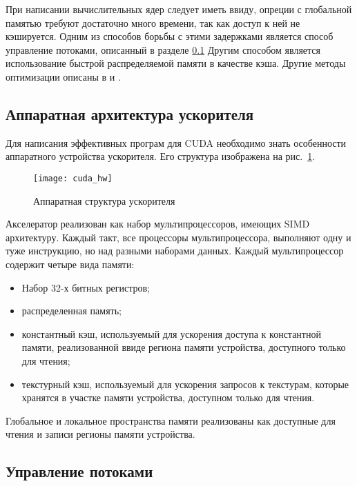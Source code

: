 При написании вычислительных ядер следует иметь ввиду, опреции с глобальной памятью требуют достаточно много времени, так как доступ к ней не кэшируется. Одним из способов борьбы с этими задержками является способ управление потоками, описанный в разделе \ref{c:cuda_hw} Другим способом является использование быстрой распределяемой памяти в качестве кэша. Другие методы оптимизации описаны в \cite{cuda_struct_alg} и \cite{cuda_optim}.

\subsection{Аппаратная архитектура ускорителя}
\label{c:cuda_hw}

Для написания эффективных програм для CUDA необходимо знать особенности аппаратного устройства ускорителя. Его структура изображена на рис.~\ref{fig:cuda_hw}.

\begin{figure}[ht]
\center
\texttt{[image: cuda\_hw]}
\caption{Аппаратная структура ускорителя}
\label{fig:cuda_hw}
\end{figure}

Акселератор реализован как набор мультипроцессоров, имеющих SIMD архитектуру. Каждый такт, все процессоры мультипроцессора, выполняют одну и туже инструкцию, но над разными наборами данных. Каждый мультипроцессор содержит четыре вида памяти:

\begin{itemize}
\item Набор 32-х битных регистров;

\item распределенная память;

\item константный кэш, используемый для ускорения доступа к константной памяти, реализованной ввиде региона памяти устройства, доступного только для чтения;

\item текстурный кэш, используемый для ускорения запросов к текстурам, которые хранятся в участке памяти устройства, доступном только для чтения.
\end{itemize}

Глобальное и локальное пространства памяти реализованы как доступные для чтения и записи регионы памяти устройства.

\subsection{Управление потоками}

